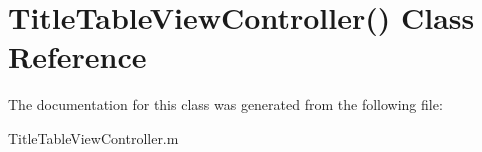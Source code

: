 \hypertarget{interface_title_table_view_controller_07_08}{\section{\-Title\-Table\-View\-Controller() \-Class \-Reference}
\label{interface_title_table_view_controller_07_08}
}


\-The documentation for this class was generated from the following file\-:\begin{DoxyCompactItemize}
\item 
\-Title\-Table\-View\-Controller.\-m\end{DoxyCompactItemize}
